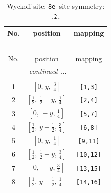 \documentclass[fleqn,8pt]{jsarticle}
\begin{document}
\renewcommand{\arraystretch}{1.2}
\begin{longtable}{ccc}
\caption{Wyckoff site: {\tt 8e}, site symmetry: {\tt .2.}}
 \\
 \hline \hline
No. & position & mapping \\ \hline \endfirsthead

\multicolumn{2}{l}{\tablename\ \thetable{}} \\
 \hline \hline
No. & position & mapping \\ \hline \endhead

 \hline \hline
\multicolumn{2}{r}{\footnotesize\it continued ...} \\ \endfoot

 \hline \hline
\multicolumn{2}{r}{} \\ \endlastfoot

1 & $\left[ 0,\, y,\, \frac{3}{4} \right]$ & {\tt [1,3]} \\ \hline
2 & $\left[ \frac{1}{2},\, \frac{1}{2} - y,\, \frac{1}{4} \right]$ & {\tt [2,4]} \\ \hline
3 & $\left[ 0,\, - y,\, \frac{1}{4} \right]$ & {\tt [5,7]} \\ \hline
4 & $\left[ \frac{1}{2},\, y + \frac{1}{2},\, \frac{3}{4} \right]$ & {\tt [6,8]} \\ \hline
5 & $\left[ 0,\, y,\, \frac{1}{4} \right]$ & {\tt [9,11]} \\ \hline
6 & $\left[ \frac{1}{2},\, \frac{1}{2} - y,\, \frac{3}{4} \right]$ & {\tt [10,12]} \\ \hline
7 & $\left[ 0,\, - y,\, \frac{3}{4} \right]$ & {\tt [13,15]} \\ \hline
8 & $\left[ \frac{1}{2},\, y + \frac{1}{2},\, \frac{1}{4} \right]$ & {\tt [14,16]} \\
\end{longtable}
\renewcommand{\arraystretch}{1.2}
\end{document}

